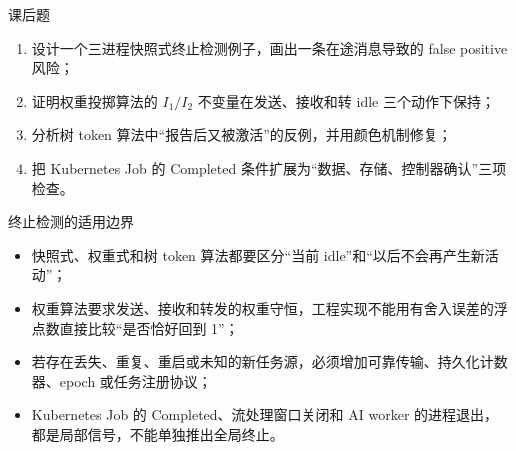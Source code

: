 \documentclass[UTF8,fontset=none,aspectratio=169,10pt]{beamer}
\begin{document}
\begin{frame}{课后题}
\begin{enumerate}
  \item 设计一个三进程快照式终止检测例子，画出一条在途消息导致的 false positive 风险；
  \item 证明权重投掷算法的 $I_1/I_2$ 不变量在发送、接收和转 idle 三个动作下保持；
  \item 分析树 token 算法中“报告后又被激活”的反例，并用颜色机制修复；
  \item 把 Kubernetes Job 的 Completed 条件扩展为“数据、存储、控制器确认”三项检查。
\end{enumerate}
\end{frame}

\begin{frame}{终止检测的适用边界}
\small
\begin{itemize}
  \item 快照式、权重式和树 token 算法都要区分“当前 idle”和“以后不会再产生新活动”；
  \item 权重算法要求发送、接收和转发的权重守恒，工程实现不能用有舍入误差的浮点数直接比较“是否恰好回到 1”；
  \item 若存在丢失、重复、重启或未知的新任务源，必须增加可靠传输、持久化计数器、epoch 或任务注册协议；
  \item Kubernetes Job 的 Completed、流处理窗口关闭和 AI worker 的进程退出，都是局部信号，不能单独推出全局终止。
\end{itemize}
\vfill
{}
\end{frame}
\end{document}
